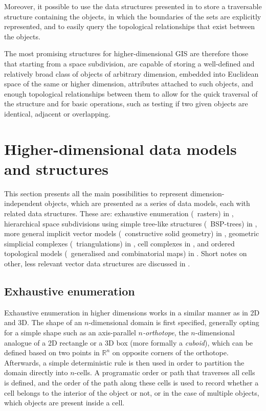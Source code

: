 Moreover, it possible to use the data structures presented in  to store a traversable structure containing the objects, in which the boundaries of the sets are explicitly represented, and to easily query the topological relationships that exist between the objects.

The most promising structures for higher-dimensional GIS are therefore those that starting from a space subdivision, are capable of storing a well-defined and relatively broad class of objects of arbitrary dimension, embedded into Euclidean space of the same or higher dimension, attributes attached to such objects, and enough topological relationships between them to allow for the quick traversal of the structure and for basic operations, such as testing if two given objects are identical, adjacent or overlapping.

\section{Higher-dimensional data models and structures}
\label{se:data-structures}

This section presents all the main possibilities to represent dimension-independent objects, which are presented as a series of data models, each with related data structures.
These are: exhaustive enumeration (\eg\ rasters) in , hierarchical space subdivisions using simple tree-like structures (\eg\ BSP-trees) in , more general implicit vector models (\eg\ constructive solid geometry) in , geometric simplicial complexes (\ie\ triangulations) in , cell complexes in , and ordered topological models (\eg\ generalised and combinatorial maps) in .
Short notes on other, less relevant vector data structures are discussed in .

\subsection{Exhaustive enumeration}
\label{ss:regular-partitions}

Exhaustive enumeration in higher dimensions works in a similar manner as in 2D and 3D.
The shape of an $n$-dimensional domain is first specified, generally opting for a simple shape such as an axis-parallel \emph{$n$-orthotope}, the $n$-dimensional analogue of a 2D rectangle or a 3D box (more formally a \emph{cuboid}), which can be defined based on two points in $\mathbb{R}^n$ on opposite corners of the orthotope.
Afterwards, a simple deterministic rule is then used in order to partition the domain directly into $n$-cells.
A programatic order or path that traverses all cells is defined, and the order of the path along these cells is used to record whether a cell belongs to the interior of the object or not, or in the case of multiple objects, which objects are present inside a cell.

